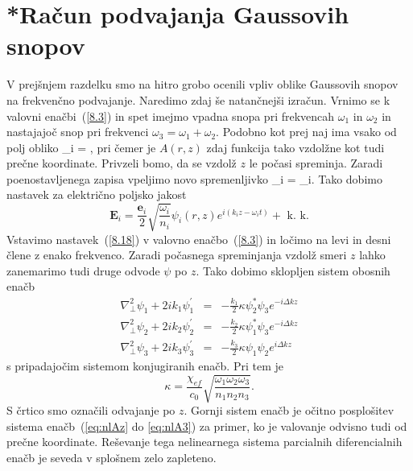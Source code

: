 \section{{*}Račun podvajanja Gaussovih snopov}
V prejšnjem razdelku smo na hitro grobo ocenili vpliv oblike Gaussovih snopov
na frekvenčno podvajanje. Naredimo zdaj še natančnejši izračun. Vrnimo se k valovni
enačbi~(\ref{8.3}) in spet imejmo vpadna snopa pri frekvencah
$\omega_{1}$ in $\omega_{2}$ in nastajajoč snop pri frekvenci
$\omega_{3}=\omega_{1}+\omega_{2}$.
Podobno kot prej naj ima vsako od polj obliko 
\beq
{}_{i}  = ,
\eeq
pri čemer je $A(r,z)$ zdaj funkcija tako vzdolžne kot tudi prečne koordinate. Privzeli
bomo, da se vzdolž $z$ le počasi spreminja.
Zaradi poenostavljenega zapisa vpeljimo novo spremenljivko 
\beq
\psi_i = _i.
\eeq
Tako dobimo nastavek za električno poljsko jakost
\begin{equation}
\mathbf{E}_{i}=\frac{\mathbf{e}_{i}}{2}\sqrt{\frac{\omega_{i}}{n_{i}}}\psi_{i}(r,z)
e^{i(k_{i}z-\omega_{i}t)}+\mbox{ k. k.}
\label{8.18}
\end{equation}
Vstavimo nastavek~(\ref{8.18}) v valovno
enačbo~(\ref{8.3}) in ločimo na levi in desni člene z enako frekvenco.
Zaradi počasnega spreminjanja vzdolž smeri $z$ lahko zanemarimo tudi druge odvode 
$\psi$ po $z$. Tako dobimo sklopljen sistem obosnih enačb 
\begin{eqnarray}
\nabla_{\perp}^{2}\psi_{1}+2ik_{1}\psi_{1}^{\prime} & = & -
\frac{k_{1}}{2}\kappa\psi_{2}^{\ast}\psi_{3}e^{-i\Delta kz}\\
\nabla_{\perp}^{2}\psi_{2}+2ik_{2}\psi_{2}^{\prime} & = & -
\frac{k_{2}}{2}\kappa\psi_{1}^{\ast}\psi_{3}e^{-i\Delta kz}\\
\nabla_{\perp}^{2}\psi_{3}+2ik_{3}\psi_{3}^{\prime} & =
& - \frac{k_{3}}{2}\kappa\psi_{1}\psi_{2}e^{i\Delta kz}
\label{SHGGauss_3}
\end{eqnarray}
s pripadajočim sistemom konjugiranih enačb. Pri tem je 
\begin{equation}
\kappa=\frac{\chi_{ef}}{c_0} \sqrt{\frac{\omega_{1}\omega_{2}\omega_{3}}{n_{1}n_{2}n_{3}}}.
\label{8.20}
\end{equation}
S črtico smo označili odvajanje po $z$. Gornji sistem enačb je očitno
posplošitev sistema enačb~(\ref{eq:nlAz} do \ref{eq:nlA3}) za primer, ko je valovanje odvisno
tudi od prečne koordinate. Reševanje tega nelinearnega sistema parcialnih
diferencialnih enačb je seveda v splošnem zelo zapleteno.

